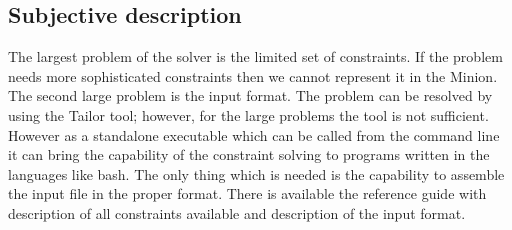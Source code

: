 \subsection{Subjective description}
The largest problem of the solver is the limited set of constraints. If the problem needs
more sophisticated constraints then we cannot represent it in the Minion.
The second large problem is the input format. The problem can be resolved 
by using the Tailor tool; however, for the large problems the tool is not sufficient.
However as a standalone executable which can be called from the command line it can bring the capability of 
the constraint solving to programs written in the languages like bash. The only
thing which is needed is the capability to assemble the input file in the proper format. 
There is available the reference guide \cite{minion:manual} with description of all constraints available and
description of the input format.